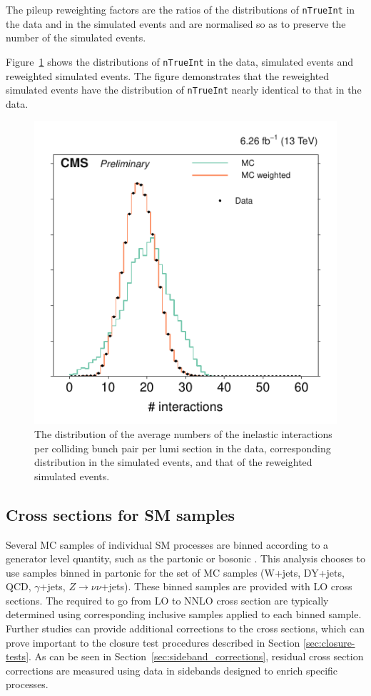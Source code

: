 The pileup reweighting factors are the ratios of the distributions of
\verb!nTrueInt! in the data and in the simulated events and are
normalised so as to preserve the number of the simulated events.

Figure~\ref{f044_corr_nTrueInt_data_mc_norm} shows the distributions
of \verb!nTrueInt! in the data, simulated events and reweighted
simulated events. The figure demonstrates that the reweighted
simulated events have the distribution of \verb!nTrueInt! nearly
identical to that in the data.

\begin{figure}[!b]
\centering
\includegraphics[scale=1.00]{figures/pileup_reweighting/f044_corr_nTrueInt_data_mc_norm}
\caption{The distribution of the average numbers of the inelastic
interactions per colliding bunch pair per lumi section in the data,
corresponding distribution in the simulated events, and that of the
reweighted simulated events.} \label{f044_corr_nTrueInt_data_mc_norm}
\end{figure}


\subsection{Cross sections for SM samples}
\label{sec:SMxs}
Several MC samples of individual SM processes are binned according to a generator level quantity, 
such as the partonic \HT or bosonic \PT.
This analysis chooses to use samples binned in partonic \HT 
for the set of MC samples (W+jets, DY+jets, QCD, $\gamma$+jets, $Z\rightarrow \nu\nu$+jets).
These binned samples are provided with LO cross sections. 
The \kfactors required to go from LO to NNLO cross section are typically determined using corresponding
inclusive samples applied to each \HT binned sample.
Further studies can provide additional corrections to the cross sections, 
which can prove important to the closure test procedures described in
Section \ref{sec:closure-tests}. As can be seen in Section~\ref{sec:sideband_corrections}, residual cross section
corrections are measured using data in sidebands designed to enrich specific processes.

